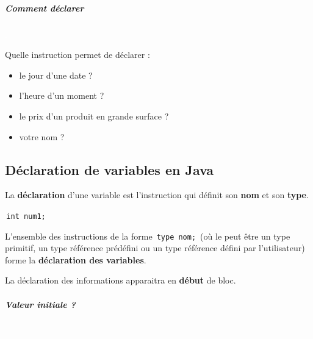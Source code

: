 \documentclass[11pt,a4paper]{article}
\begin{document}
            \par
        
			
		\subparagraph{Comment d\'eclarer} 
		
                \textcolor{white}{.} \par
            
							  Quelle instruction permet de d\'eclarer :
							
					\begin{itemize}
				
			\item le jour d'une date ? \textcolor{gray}{\underline{\hspace*{10em}}} 
			\item l'heure d'un moment ?  \textcolor{gray}{\underline{\hspace*{10em}}} 
			\item le prix d'un produit en grande surface ? \textcolor{gray}{\underline{\hspace*{10em}}} 
			\item votre nom ?  \textcolor{gray}{\underline{\hspace*{10em}}} 
					\end{itemize}
				\subsection{D\'eclaration de variables en Java}
          La \textbf{d\'eclaration} d'une variable est l'instruction qui d\'efinit son \textbf{nom} 
          et son \textbf{type}.
        
            \par
        \,\verb|int num1;|\,
            \par
        
          L'ensemble des instructions de la forme \,\verb|type nom;|\,
          (o\`u le \verb@type@ peut \^etre un type primitif, un type r\'ef\'erence pr\'ed\'efini ou un type r\'ef\'erence d\'efini par l'utilisateur) 
          forme la \textbf{d\'eclaration des variables}. 
        
            \par
        
          La d\'eclaration des informations apparaitra en \textbf{d\'ebut} de bloc.
        
            \par
        
			
		\subparagraph{Valeur initiale ?} 
		
					\textcolor{white}{.} \par
				
\end{document}
